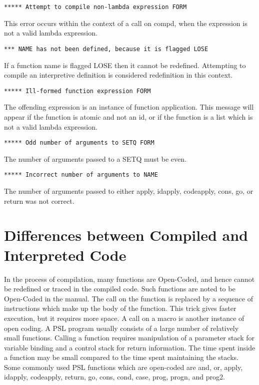 \begin{verbatim}
***** Attempt to compile non-lambda expression FORM
\end{verbatim}
This  error  occurs  within the context of a call on compd, when
the expression is not a valid lambda expression.

\begin{verbatim}
*** NAME has not been defined, because it is flagged LOSE
\end{verbatim}
If a function name is flagged LOSE then it cannot be  redefined.
Attempting  to  compile an interpretive definition is considered
redefinition in this context.

\begin{verbatim}
***** Ill-formed function expression FORM
\end{verbatim}

The offending expression is an instance of function application.
This message will appear if the function is atomic  and  not  an
id,  or  if  the  function is a list which is not a valid lambda
expression.

\begin{verbatim}
***** Odd number of arguments to SETQ FORM
\end{verbatim}

The number of arguments passed to a SETQ must be even.

\begin{verbatim}
***** Incorrect number of arguments to NAME
\end{verbatim}

The  number  of  arguments  passed  to  either  apply,  idapply,
codeapply, cons, go, or return was not correct.

\section{Differences between Compiled and Interpreted Code}

  In  the process of compilation, many functions are Open-Coded,
and hence cannot be redefined or traced in  the  compiled  code.
Such  functions  are  noted  to be Open-Coded in the manual. The
call on the function is replaced by a sequence  of  instructions
which  make up the body of the function. This trick gives faster
execution, but it requires more space. A  call  on  a  macro  is
another  instance of open coding. A PSL program usually consists
of a large number  of  relatively  small  functions.  Calling  a
function requires manipulation of a parameter stack for variable
binding  and  a  control  stack for return information. The time
spent inside a function may be small compared to the time  spent
maintaining  the stacks.  Some commonly used PSL functions which
are open-coded are and, or, apply, idapply,  codeapply,  return,
go, cons, cond, case, prog, progn, and prog2.

